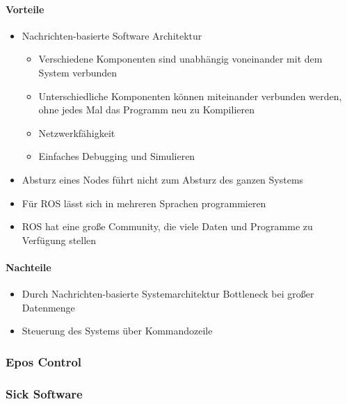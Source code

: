 \paragraph*{Vorteile}
\begin{itemize}
 \item Nachrichten-basierte Software Architektur
\begin{itemize}
\item Verschiedene Komponenten sind unabhängig voneinander mit dem System verbunden
\item Unterschiedliche Komponenten können miteinander verbunden werden, ohne jedes Mal das Programm neu zu Kompilieren
\item Netzwerkfähigkeit
\item Einfaches Debugging und Simulieren
\end{itemize}
\item Absturz eines Nodes führt nicht zum Absturz des ganzen
Systems
\item Für ROS lässt sich in mehreren Sprachen programmieren
\item ROS hat eine große Community, die viele Daten und Programme zu Verfügung
stellen
\end{itemize}
\paragraph*{Nachteile}
\begin{itemize}
 \item Durch Nachrichten-basierte Systemarchitektur Bottleneck bei großer Datenmenge
\item Steuerung des Systems über Kommandozeile
\end{itemize}

\subsubsection{Epos Control}

\subsubsection{Sick Software}